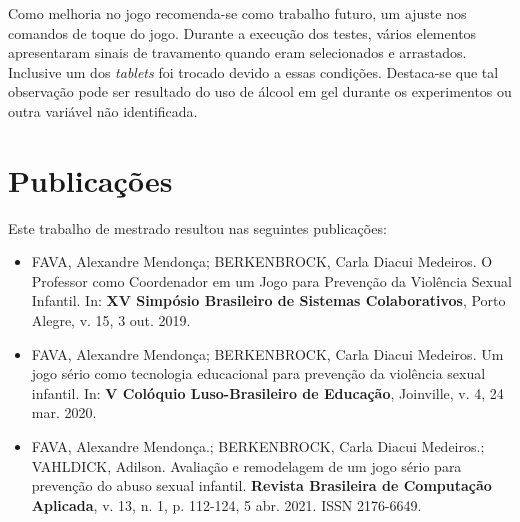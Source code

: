 Como melhoria no jogo recomenda-se como trabalho futuro, um ajuste nos comandos de toque do jogo. Durante a execução dos testes, vários elementos apresentaram sinais de travamento quando eram selecionados e arrastados. Inclusive um dos \textit{tablets} foi trocado devido a essas condições. Destaca-se que tal observação pode ser resultado do uso de álcool em gel durante os experimentos ou outra variável não identificada. 















\section{Publicações}\label{sec:publicar}

Este trabalho de mestrado resultou nas seguintes publicações:

\begin{itemize}
    \item FAVA, Alexandre Mendonça; BERKENBROCK, Carla Diacui Medeiros. O Professor como Coordenador em um Jogo para Prevenção da Violência Sexual Infantil. In: \textbf{XV Simpósio Brasileiro de Sistemas Colaborativos}, Porto Alegre, v. 15, 3 out. 2019.
    \item FAVA, Alexandre Mendonça; BERKENBROCK, Carla Diacui Medeiros. Um jogo sério como tecnologia educacional para prevenção da violência sexual infantil. In: \textbf{V Colóquio Luso-Brasileiro de Educação}, Joinville, v. 4, 24 mar. 2020. 
    \item FAVA, Alexandre Mendonça.; BERKENBROCK, Carla Diacui Medeiros.; VAHLDICK, Adilson. Avaliação e remodelagem de um jogo sério para prevenção do abuso sexual infantil. \textbf{Revista Brasileira de Computação Aplicada}, v. 13, n. 1, p. 112-124, 5 abr. 2021. ISSN 2176-6649.
\end{itemize}